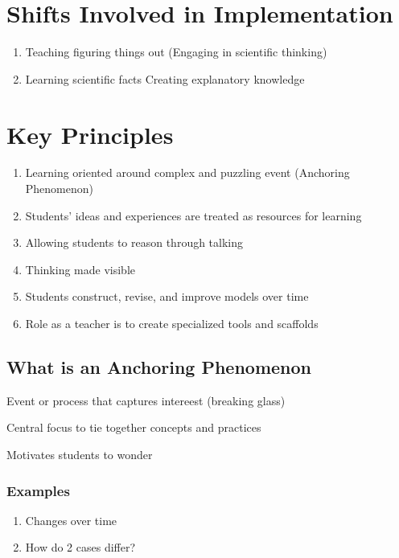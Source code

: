 \documentclass{notes}
\begin{document}
\section{Shifts Involved in Implementation}
\begin{enumerate}
    \item Teaching \indicates \hspace*{1px} figuring things out (Engaging in scientific thinking)
    \item Learning scientific facts \indicates \hspace*{1px} Creating explanatory knowledge
\end{enumerate}

\section{Key Principles}
\begin{enumerate}
    \item Learning oriented around complex and puzzling event (Anchoring Phenomenon)
    \item Students' ideas and experiences are treated as resources for learning
    \item Allowing students to reason through talking
    \item Thinking made visible
    \item Students construct, revise, and improve models over time
    \item Role as a teacher is to create specialized tools and scaffolds
\end{enumerate}

\subsection{What is an Anchoring Phenomenon}
Event or process that captures intereest (breaking glass)

Central focus to tie together concepts and practices

\tab \indicates Motivates students to wonder

\subsubsection*{Examples}
\begin{enumerate}
    \item Changes over time
    \item How do 2 cases differ?
\end{enumerate}
\end{document}
